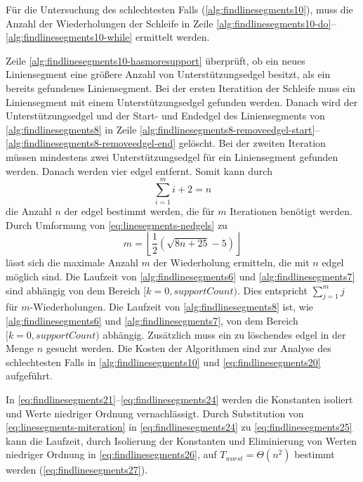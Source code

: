 Für die Untersuchung des schlechtesten Falls (\autoref{alg:findlinesegments10}), muss die Anzahl der Wiederholungen der
 Schleife in Zeile \ref{alg:findlinesegments10-do}--\ref{alg:findlinesegments10-while} ermittelt werden.

Zeile \ref{alg:findlinesegments10-hasmoresupport} überprüft, ob ein neues Liniensegment eine größere Anzahl von
 Unterstützungsedgel besitzt, als ein bereits gefundenes Liniensegment. Bei der ersten Iteratition der Schleife muss
 ein Liniensegment mit einem Unterstützungsedgel gefunden werden. Danach wird der Unterstützungsedgel und der Start-
 und Endedgel des Liniensegments von \autoref{alg:findlinesegments8} in Zeile
 \ref{alg:findlinesegments8-removeedgel-start}--\ref{alg:findlinesegments8-removeedgel-end} gelöscht. Bei der zweiten
 Iteration müssen mindestens zwei Unterstützungsedgel für ein Liniensegment gefunden werden. Danach werden vier
 \gls{edgel} entfernt. Somit kann durch
\begin{equation}
\label{eq:linesegments-nedgels}
\sum_{i=1}^{m} i + 2 = n
\end{equation}
die Anzahl $n$ der \gls{edgel} bestimmt werden, die für $m$ Iterationen benötigt werden. Durch Umformung von \autoref{eq:linesegments-nedgels} zu
\begin{equation}
\label{eq:linesegments-miteration}
m = \left\lfloor\frac{1}{2}(\sqrt{8n+25} - 5)\right\rfloor
\end{equation}
lässt sich die maximale Anzahl $m$ der Wiederholung ermitteln, die mit $n$ \gls{edgel} möglich sind. Die Laufzeit von
 \autoref{alg:findlinesegments6} und \autoref{alg:findlinesegments7} sind abhängig von dem Bereich
 $[k=0,supportCount)$. Dies entspricht $\sum_{j=1}^{m}j$ für $m$-Wiederholungen.  Die Laufzeit von
 \autoref{alg:findlinesegments8} ist, wie \autoref{alg:findlinesegments6} und \autoref{alg:findlinesegments7}, von dem
 Bereich $[k=0,supportCount)$ abhängig. Zusätzlich muss ein zu löschendes \gls{edgel} in der Menge $n$ gesucht werden.
 Die Kosten der Algorithmen sind zur Analyse des schlechtesten Falls in \autoref{alg:findlinesegments10} und
 \autoref{eq:findlinesegments20} aufgeführt.

In \autoref{eq:findlinesegments21}--\autoref{eq:findlinesegments24} werden die Konstanten isoliert und Werte niedriger
 Ordnung vernachlässigt. Durch Substitution von \autoref{eq:linesegments-miteration} in \autoref{eq:findlinesegments24}
 zu \autoref{eq:findlinesegments25} kann die Laufzeit, durch Isolierung der Konstanten und Eliminierung von Werten
 niedriger Ordnung in \autoref{eq:findlinesegments26}, auf $T_{worst}=\Theta(n^2)$ bestimmt werden
 (\autoref{eq:findlinesegments27}).


